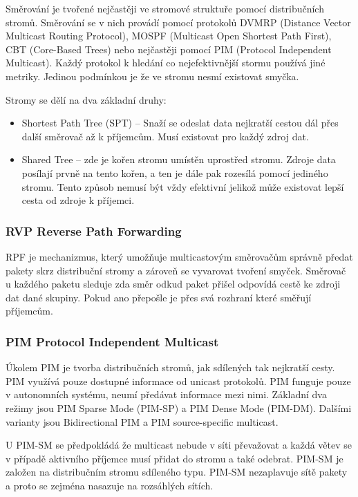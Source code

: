 Směrování je tvořené nejčastěji ve stromové struktuře pomocí distribučních stromů.
Směrování se v nich provádí pomocí protokolů DVMRP (Distance Vector Multicast Routing Protocol), MOSPF (Multicast Open Shortest Path First), CBT (Core-Based Trees) nebo nejčastěji pomocí PIM (Protocol Independent Multicast).
Každý protokol k hledání co nejefektivnější stormu používá jiné metriky.
Jedinou podmínkou je že ve stromu nesmí existovat smyčka.

Stromy se dělí na dva základní druhy:

\begin{itemize}[noitemsep]
    \item Shortest Path Tree (SPT) -- Snaží se odeslat data nejkratší cestou dál přes další směrovač až k příjemcům.
    Musí existovat pro každý zdroj dat.
    \item Shared Tree -- zde je kořen stromu umístěn uprostřed stromu.
    Zdroje data posílají prvně na tento kořen, a ten je dále pak rozesílá pomocí jediného stromu.
    Tento způsob nemusí být vždy efektivní jelikož může existovat lepší cesta od zdroje k příjemci.
\end{itemize}

\subsubsection{RVP Reverse Path Forwarding}

RPF je mechanizmus, který umožňuje multicastovým směrovačům správně předat pakety skrz distribuční stromy a zároveň se vyvarovat tvoření smyček.
Směrovač u každého paketu sleduje zda směr odkud paket přišel odpovídá cestě ke zdroji dat dané skupiny.
Pokud ano přepošle je přes svá rozhraní které směřují příjemcům.

\subsubsection{PIM Protocol Independent Multicast}

Úkolem PIM je tvorba distribučních stromů, jak sdílených tak nejkratší cesty.
PIM využívá pouze dostupné informace od unicast protokolů.
PIM funguje pouze v autonomních systému, neumí předávat informace mezi nimi.
Základní dva režimy jsou PIM Sparse Mode (PIM-SP) a PIM Dense Mode (PIM-DM). Dalšími varianty jsou Bidirectional PIM a PIM source-specific multicast.

U PIM-SM se předpokládá že multicast nebude v síti převažovat a každá větev se v případě aktivního příjemce musí přidat do stromu a také odebrat.
PIM-SM je založen na distribučním stromu sdíleného typu.
PIM-SM nezaplavuje sítě pakety a proto se zejména nasazuje na rozsáhlých sítích.

